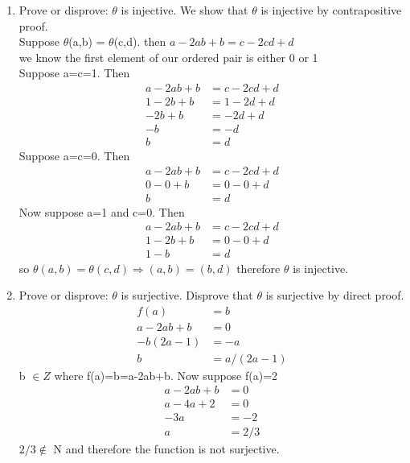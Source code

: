 \documentclass{article}
\begin{document}
\begin{enumerate}
\item Prove or disprove: $\theta$ is injective.
\answer We show that $\theta$ is injective by contrapositive proof.\\ Suppose $\theta$(a,b) = $\theta$(c,d). then $a-2ab+b=c-2cd+d$\\
we know the first element of our ordered pair is either 0 or 1\\ Suppose a=c=1. Then\\
\begin{align*}
    a-2ab+b&=c-2cd+d\\ 1-2b+b&=1-2d+d\\ -2b+b&=-2d+d\\ -b&=-d\\ b&=d
\end{align*}
Suppose a=c=0. Then
\begin{align*}
    a-2ab+b&=c-2cd+d\\ 0-0+b&=0-0+d\\ b&=d
\end{align*}
Now suppose a=1 and c=0. Then
\begin{align*}
    a-2ab+b&=c-2cd+d\\ 1-2b+b&=0-0+d\\ 1-b&=d
\end{align*}
so $\theta(a,b)=\theta(c,d)\Rightarrow(a,b)=(b,d) $ therefore $\theta$ is injective.
\pagebreak
\item Prove or disprove: $\theta$ is surjective.
\answer Disprove that $\theta$ is surjective by direct proof.
\begin{align*}
 f(a) &= b\\ a - 2ab + b &= 0\\ -b(2a-1) &=-a\\ b&=a/(2a-1)
\end{align*}
b $\in Z$ where f(a)=b=a-2ab+b. Now suppose f(a)=2
\begin{align*}
    a-2ab+b&=0\\ a-4a+2&=0\\ -3a&=-2\\ a&=2/3
\end{align*}
$2/3 \notin$ N and therefore the function is not surjective.
\end{enumerate}
\end{document}
